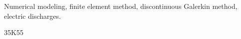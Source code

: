 \documentclass[review,hidelinks,onefignum,onetabnum]{siamart220329}
\begin{document}
%
%
\maketitle

\begin{abstract}
  \lipsum[1]
\end{abstract}

\begin{keywords}
    Numerical modeling, finite element method, discontinuous Galerkin method, electric discharges. 
\end{keywords}

\begin{MSCcodes}
    35K55
\end{MSCcodes}
%
%
\end{document}
